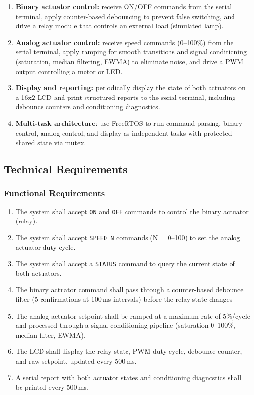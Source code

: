 \begin{enumerate}
    \item \textbf{Binary actuator control:} receive ON/OFF commands from the serial terminal, apply counter-based debouncing to prevent false switching, and drive a relay module that controls an external load (simulated lamp).
    \item \textbf{Analog actuator control:} receive speed commands (0--100\%) from the serial terminal, apply ramping for smooth transitions and signal conditioning (saturation, median filtering, EWMA) to eliminate noise, and drive a PWM output controlling a motor or LED.
    \item \textbf{Display and reporting:} periodically display the state of both actuators on a 16x2 LCD and print structured reports to the serial terminal, including debounce counters and conditioning diagnostics.
    \item \textbf{Multi-task architecture:} use FreeRTOS to run command parsing, binary control, analog control, and display as independent tasks with protected shared state via mutex.
\end{enumerate}

\subsection{Technical Requirements}

\subsubsection{Functional Requirements}

\begin{enumerate}
    \item[FR1] The system shall accept \texttt{ON} and \texttt{OFF} commands to control the binary actuator (relay).
    \item[FR2] The system shall accept \texttt{SPEED N} commands (N = 0--100) to set the analog actuator duty cycle.
    \item[FR3] The system shall accept a \texttt{STATUS} command to query the current state of both actuators.
    \item[FR4] The binary actuator command shall pass through a counter-based debounce filter (5 confirmations at 100\,ms intervals) before the relay state changes.
    \item[FR5] The analog actuator setpoint shall be ramped at a maximum rate of 5\%/cycle and processed through a signal conditioning pipeline (saturation 0--100\%, median filter, EWMA).
    \item[FR6] The LCD shall display the relay state, PWM duty cycle, debounce counter, and raw setpoint, updated every 500\,ms.
    \item[FR7] A serial report with both actuator states and conditioning diagnostics shall be printed every 500\,ms.
\end{enumerate}

